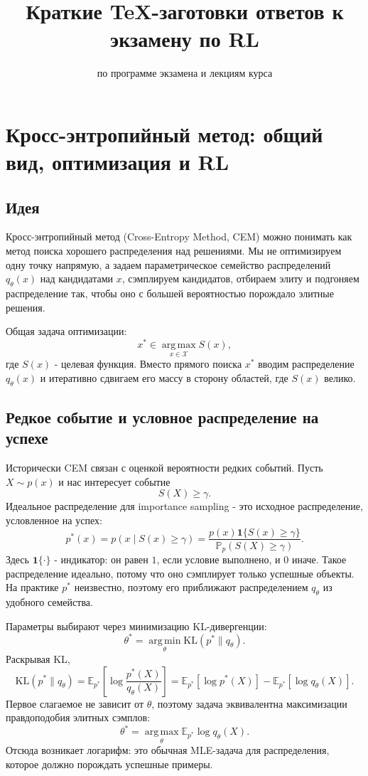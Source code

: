 \documentclass[11pt,a4paper]{article}
\title{Краткие TeX-заготовки ответов к экзамену по RL}
\author{по программе экзамена и лекциям курса}
\date{}
\newcommand{\E}{\mathbb{E}}
\renewcommand{\Prob}{\mathbb{P}}
\newcommand{\KL}{\mathrm{KL}}
\newcommand{\argmax}{\operatorname*{arg\,max}}
\newcommand{\argmin}{\operatorname*{arg\,min}}
\newcommand{\1}{\mathbf{1}}
\begin{document}
\maketitle
\tableofcontents
\newpage

\section{Кросс-энтропийный метод: общий вид, оптимизация и RL}

\subsection*{Идея}
Кросс-энтропийный метод (Cross-Entropy Method, CEM) можно понимать как метод поиска хорошего распределения над решениями. Мы не оптимизируем одну точку напрямую, а задаем параметрическое семейство распределений $q_\theta(x)$ над кандидатами $x$, сэмплируем кандидатов, отбираем элиту и подгоняем распределение так, чтобы оно с большей вероятностью порождало элитные решения.

Общая задача оптимизации:
\[
    x^* \in \argmax_{x\in \mathcal X} S(x),
\]
где $S(x)$ - целевая функция. Вместо прямого поиска $x^*$ вводим распределение $q_\theta(x)$ и итеративно сдвигаем его массу в сторону областей, где $S(x)$ велико.

\subsection*{Редкое событие и условное распределение на успехе}
Исторически CEM связан с оценкой вероятности редких событий. Пусть $X\sim p(x)$ и нас интересует событие
\[
    S(X) \ge \gamma.
\]
Идеальное распределение для importance sampling - это исходное распределение, условленное на успех:
\[
    p^*(x) = p(x\mid S(x)\ge \gamma)
    = \frac{p(x)\1\{S(x)\ge \gamma\}}{\Prob_p(S(X)\ge \gamma)}.
\]
Здесь $\1\{\cdot\}$ - индикатор: он равен $1$, если условие выполнено, и $0$ иначе. Такое распределение идеально, потому что оно сэмплирует только успешные объекты. На практике $p^*$ неизвестно, поэтому его приближают распределением $q_\theta$ из удобного семейства.

Параметры выбирают через минимизацию KL-дивергенции:
\[
    \theta^* = \argmin_\theta \KL(p^*\|q_\theta).
\]
Раскрывая KL,
\[
    \KL(p^*\|q_\theta)
    = \E_{p^*}\left[\log \frac{p^*(X)}{q_\theta(X)}\right]
    = \E_{p^*}[\log p^*(X)] - \E_{p^*}[\log q_\theta(X)].
\]
Первое слагаемое не зависит от $\theta$, поэтому задача эквивалентна максимизации правдоподобия элитных сэмплов:
\[
    \theta^* = \argmax_\theta \E_{p^*}\log q_\theta(X).
\]
Отсюда возникает логарифм: это обычная MLE-задача для распределения, которое должно порождать успешные примеры.
\end{document}
